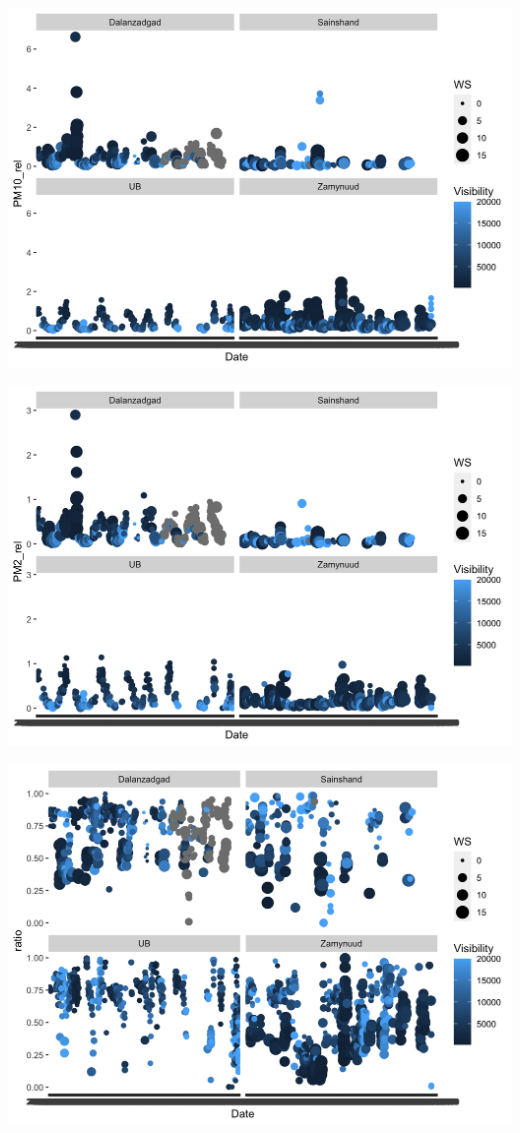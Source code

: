 \documentclass[
]{agujournal2019}
\begin{document}
\includegraphics{index_files/figure-latex/notebooks-01_datawork-cell-12-output-3.png}

\includegraphics{index_files/figure-latex/notebooks-01_datawork-cell-12-output-4.png}

\includegraphics{index_files/figure-latex/notebooks-01_datawork-cell-12-output-5.png}
\end{document}
